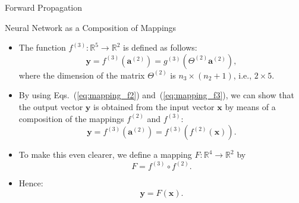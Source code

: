 \documentclass[8pt,american]{beamer}
\begin{document}
\begin{frame}{Forward Propagation}

\begin{block}{Neural Network as a Composition of Mappings}
\begin{itemize}
\justifying
\item The function $f^{\left(3\right)}:\mathbb{R}^{5}\rightarrow\mathbb{R}^{2}$
  is defined as follows:
  \begin{equation}
  \mathbf{y}=f^{\left(3\right)}\left(\mathbf{a}^{\left(2\right)}\right)=g^{\left(3\right)}\left(\Theta^{\left(2\right)}\mathbf{a}^{\left(2\right)}\right),
  \label{eq:mapping_f3}
  \end{equation}
  where the dimension of the matrix $\Theta^{\left(2\right)}$ is
  $n_{3}\times\left(n_{2}+1\right)$, i.e., $2\times5$.
\item By using Eqs.~(\ref{eq:mapping_f2}) and~(\ref{eq:mapping_f3}), we can
  show that the output vector $\mathbf{y}$ is obtained from the input vector
  $\mathbf{x}$ by means of a composition of the mappings $f^{\left(2\right)}$
  and $f^{\left(3\right)}$:
  \begin{equation}
  \mathbf{y}=f^{\left(3\right)}\left(\mathbf{a}^{\left(2\right)}\right)=f^{\left(3\right)}\left(f^{\left(2\right)}\left(\mathbf{x}\right)\right).
  \end{equation}
\item To make this even clearer, we define a mapping
  $F:\mathbb{R}^{4}\rightarrow\mathbb{R}^{2}$ by
  \begin{equation}
  F=f^{\left(3\right)}\circ f^{\left(2\right)}.
  \end{equation}
\item Hence:
  \begin{equation}
  \mathbf{y}=F\left(\mathbf{x}\right).
  \end{equation}
\end{itemize}
\end{block}

\end{frame}
\end{document}
